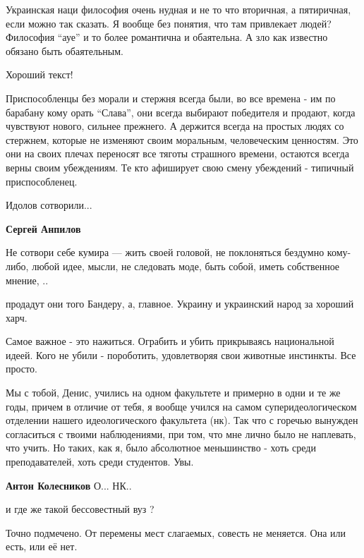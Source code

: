 \begin{itemize}

Украинская наци философия очень нудная и не то что вторичная, а пятиричная,
если можно так сказать. Я вообще без понятия, что там привлекает людей?
Философия \enquote{ауе} и то более романтична и обаятельна. А зло как известно обязано
быть обаятельным.

Хороший текст!


Приспособленцы без морали и стержня всегда были, во все времена - им по
барабану кому орать \enquote{Слава}, они всегда выбирают победителя и продают, когда
чувствуют нового, сильнее прежнего. А держится всегда на простых людях со
стержнем, которые не изменяют своим моральным, человеческим ценностям. Это они
на своих плечах переносят все тяготы страшного времени, остаются всегда верны
своим убеждениям. Те кто афиширует свою смену убеждений - типичный
приспособленец.

Идолов сотворили...

\textbf{Сергей Анпилов} 

Не сотвори себе кумира — жить своей головой, не поклоняться бездумно кому-либо,
любой идее, мысли, не следовать моде, быть собой, иметь собственное мнение, ..


продадут они того Бандеру, а, главное. Украину и украинский народ за хороший харч.

Самое важное - это нажиться. Ограбить и убить прикрываясь национальной идеей.
Кого не убили - пороботить, удовлетворяя свои животные инстинкты.
Все просто.


Мы с тобой, Денис, учились на одном факультете и примерно в одни и те же годы,
причем в отличие от тебя, я вообще учился на самом суперидеологическом
отделении нашего идеологического факультета (нк). Так что с горечью вынужден
согласиться с твоими наблюдениями, при том, что мне лично было не наплевать,
что учить. Но таких, как я, было абсолютное меньшинство - хоть среди
преподавателей, хоть среди студентов. Увы.

\textbf{Антон Колесников} О... НК..

и где же такой бессовестный вуз ?

Точно подмечено. От перемены мест слагаемых, совесть не меняется. Она или есть, или её нет.


\end{itemize}
